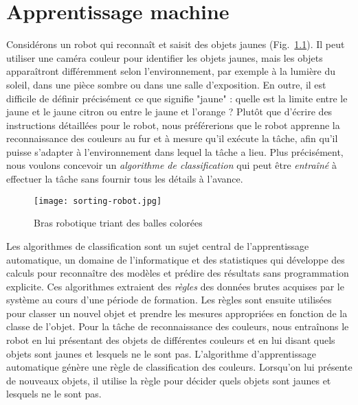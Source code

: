 
\chapter{Apprentissage machine}\label{ch.machine}

Considérons un robot qui reconnaît et saisit des objets jaunes (Fig.~\ref{fig.sortballs}). Il peut utiliser une caméra couleur pour identifier les objets jaunes, mais les objets apparaîtront différemment selon l'environnement, par exemple à la lumière du soleil, dans une pièce sombre ou dans une salle d'exposition. En outre, il est difficile de définir précisément ce que signifie "jaune" : quelle est la limite entre le jaune et le jaune citron ou entre le jaune et l'orange ? Plutôt que d'écrire des instructions détaillées pour le robot, nous préférerions que le robot apprenne la reconnaissance des couleurs au fur et à mesure qu'il exécute la tâche, afin qu'il puisse s'adapter à l'environnement dans lequel la tâche a lieu. Plus précisément, nous voulons concevoir un \emph{algorithme de classification} qui peut être \emph{entraîné} à effectuer la tâche sans fournir tous les détails à l'avance.

\begin{figure}
\begin{center}
\texttt{[image: sorting-robot.jpg]}
\end{center}
\caption{Bras robotique triant des balles colorées}\label{fig.sortballs}
\end{figure}

Les algorithmes de classification sont un sujet central de l'apprentissage automatique, un domaine de l'informatique et des statistiques qui développe des calculs pour reconnaître des modèles et prédire des résultats sans programmation explicite. Ces algorithmes extraient des \emph{règles} des données brutes acquises par le système au cours d'une période de formation. Les règles sont ensuite utilisées pour classer un nouvel objet et prendre les mesures appropriées en fonction de la classe de l'objet. Pour la tâche de reconnaissance des couleurs, nous entraînons le robot en lui présentant des objets de différentes couleurs et en lui disant quels objets sont jaunes et lesquels ne le sont pas. L'algorithme d'apprentissage automatique génère une règle de classification des couleurs. Lorsqu'on lui présente de nouveaux objets, il utilise la règle pour décider quels objets sont jaunes et lesquels ne le sont pas.


